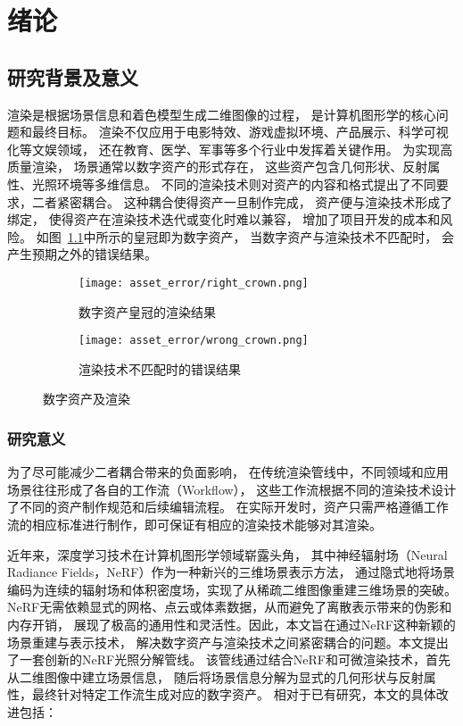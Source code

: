 
\chapter{绪论}
\section{研究背景及意义}
渲染是根据场景信息和着色模型生成二维图像的过程，
是计算机图形学的核心问题和最终目标。
渲染不仅应用于电影特效、游戏虚拟环境、产品展示、科学可视化等文娱领域，
还在教育、医学、军事等多个行业中发挥着关键作用。
为实现高质量渲染，
场景通常以数字资产的形式存在，
这些资产包含几何形状、反射属性、光照环境等多维信息。
不同的渲染技术则对资产的内容和格式提出了不同要求，二者紧密耦合。
这种耦合使得资产一旦制作完成，
资产便与渲染技术形成了绑定，
使得资产在渲染技术迭代或变化时难以兼容，
增加了项目开发的成本和风险。
如图~\ref{fig:asset_rendering}中所示的皇冠即为数字资产，
当数字资产与渲染技术不匹配时，
会产生预期之外的错误结果。
\begin{figure}[H]
  \centering
  \begin{subfigure}[t]{0.45\textwidth}
    \centering
    \texttt{[image: asset\_error/right\_crown.png]}
    \caption{数字资产皇冠的渲染结果}
  \end{subfigure}
  \begin{subfigure}[t]{0.45\textwidth}
    \centering
    \texttt{[image: asset\_error/wrong\_crown.png]}
    \caption{渲染技术不匹配时的错误结果}
  \end{subfigure}
  \caption{数字资产及渲染}
  \label{fig:asset_rendering}
\end{figure}
\subsection{研究意义}
为了尽可能减少二者耦合带来的负面影响，
在传统渲染管线中，不同领域和应用场景往往形成了各自的工作流（Workflow），
这些工作流根据不同的渲染技术设计了不同的资产制作规范和后续编辑流程。
在实际开发时，资产只需严格遵循工作流的相应标准进行制作，即可保证有相应的渲染技术能够对其渲染。

近年来，深度学习技术在计算机图形学领域崭露头角，
其中神经辐射场（Neural Radiance Fields，NeRF）作为一种新兴的三维场景表示方法，
通过隐式地将场景编码为连续的辐射场和体积密度场，实现了从稀疏二维图像重建三维场景的突破。
NeRF无需依赖显式的网格、点云或体素数据，从而避免了离散表示带来的伪影和内存开销，
展现了极高的通用性和灵活性。因此，本文旨在通过NeRF这种新颖的场景重建与表示技术，
解决数字资产与渲染技术之间紧密耦合的问题。本文提出了一套创新的NeRF光照分解管线。
该管线通过结合NeRF和可微渲染技术，首先从二维图像中建立场景信息，
随后将场景信息分解为显式的几何形状与反射属性，最终针对特定工作流生成对应的数字资产。
相对于已有研究，本文的具体改进包括：

